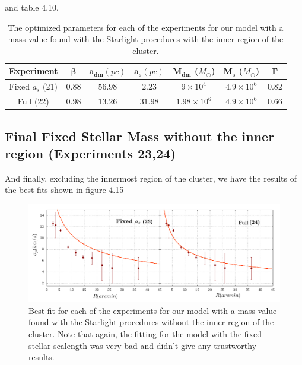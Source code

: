  and table 4.10.

\begin{table}[H]
\begin{center}
\begin{tabular}{| c| c| c| c| c| c| c|}
    \hline
    \textbf{Experiment} & $\mathbf{\beta}$ & $\mathbf{a_{dm}} (pc)$ & $\mathbf{a_{s}} (pc)$ & $\mathbf{M_{dm}}$ ($M_{\odot}$) & $\mathbf{M_{s}}$ ($M_{\odot}$) & $\mathbf{\Gamma}$\\ \hline
	Fixed $a_s$ (21) &	$0.88$ &	$56.98$ &	$2.23$ &	$9 \times 10^{4}$ &	$4.9 \times 10 ^{6}$ &	$0.82$\\ \hline
	Full (22) &	$0.98$ &	$13.26$ &	$31.98$ &	$1.98 \times 10^{6}$ &	$4.9 \times 10^{6}$ &	$0.66$\\ \hline
  \end{tabular} 
\caption[Optimized parameters for our model with a mass value based on the Starlight procedures with the inner region.]{The optimized parameters for each of the experiments for our model with a mass value found with the Starlight procedures with the inner region of the cluster.}
\end{center}
\end{table}

\subsection{Final Fixed Stellar Mass without the inner region (Experiments 23,24)}

And finally, excluding the innermost region of the cluster, we have the results of the best fits shown in figure 4.15

\begin{figure}[H]
\centering
\includegraphics[width=15cm]{images/Starlight_25_10.png}
\caption[Best fits for our model with a mass value based on the Starlight procedures without the inner region.]{Best fit for each of the experiments for our model with a mass value found with the Starlight procedures without the inner region of the cluster. Note that again, the fitting for the model with the fixed stellar scalength was very bad and didn't give any trustworthy results.}
\end{figure}

